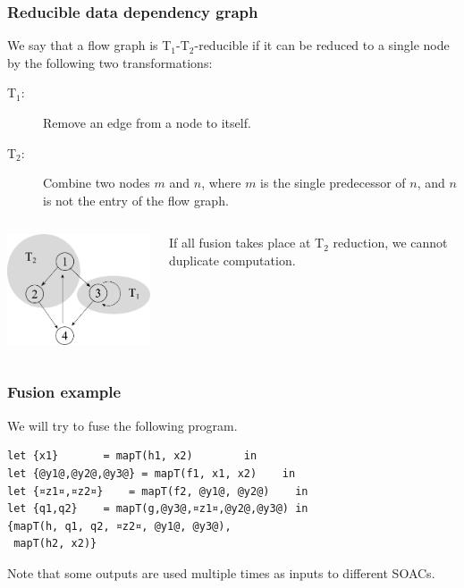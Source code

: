\documentclass[rgb,dvipsnames]{beamer}
\begin{document}
\begin{frame}
  \frametitle{Reducible data dependency graph}

  We say that a flow graph is T$_{1}$-T$_{2}$-reducible if it can be
  reduced to a single node by the following two transformations:

  \begin{description}
  \item[T$_{1}$:] Remove an edge from a node to itself.

  \item[T$_{2}$:] Combine two nodes $m$ and $n$, where $m$ is the
    single predecessor of $n$, and $n$ is not the entry of the flow
    graph.
  \end{description}

  \begin{columns}
    \begin{column}{6cm}
      \includegraphics[width=6cm]{img/t1t2.pdf}\hfill
    \end{column}
    \begin{column}{4cm}
      If all fusion takes place at T$_{2}$ reduction, we cannot
      duplicate computation.
    \end{column}
  \end{columns}

\end{frame}

\begin{frame}[fragile]
  \frametitle{Fusion example}

  We will try to fuse the following program.

\begin{lstlisting}
let {x1}       = mapT(h1, x2)        in
let {@y1@,@y2@,@y3@} = mapT(f1, x1, x2)    in
let {¤z1¤,¤z2¤}    = mapT(f2, @y1@, @y2@)    in
let {q1,q2}    = mapT(g,@y3@,¤z1¤,@y2@,@y3@) in
{mapT(h, q1, q2, ¤z2¤, @y1@, @y3@),
 mapT(h2, x2)}
\end{lstlisting}

  Note that some outputs are used multiple times as inputs to different
  SOACs.

\end{frame}
\end{document}
